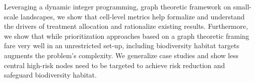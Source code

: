 Leveraging a dynamic integer programming, graph theoretic framework on small-scale landscapes, we show that cell-level metrics help formalize and understand the drivers of treatment allocation and rationalize existing results. Furthermore, we show that while prioritization approaches based on a graph theoretic framing fare very well in an unrestricted set-up, including biodiversity habitat targets augments the problem's complexity. We generalize case studies \citep{yemshanov_exploring_2022} and show less central high-risk nodes need to be targeted to achieve risk reduction and safeguard biodiversity habitat.


